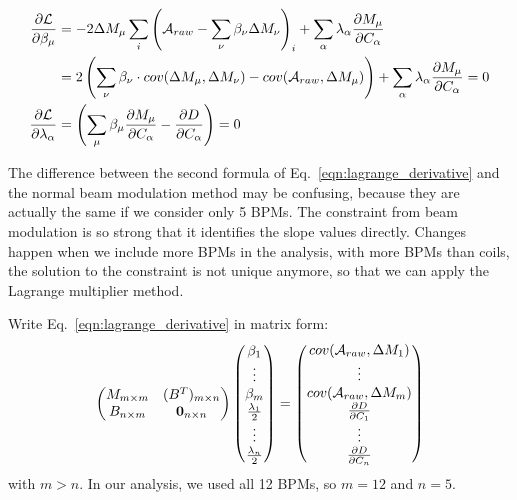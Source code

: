 \begin{equation}
    \begin{aligned}
	\frac{\partial \mathcal{L}}{\partial \beta_\mu} &= -2\Delta M_\mu \sum_i \left( \mathcal{A}_{raw} - \sum_\nu \beta_\nu \Delta M_\nu \right)_i + \sum_\alpha \lambda_\alpha \frac{\partial M_\mu}{\partial C_\alpha}    \\
	    &= 2 \left(\sum_\nu \beta_\nu \cdot cov(\Delta M_\mu, \Delta M_\nu) - cov(\mathcal{A}_{raw}, \Delta M_\mu) \right) + \sum_\alpha \lambda_\alpha \frac{\partial M_\mu}{\partial C_\alpha} = 0  \\
	\frac{\partial \mathcal{L}}{\partial \lambda_\alpha} &= \left( \sum_\mu \beta_\mu \frac{\partial M_\mu}{\partial C_\alpha} - \frac{\partial D}{\partial C_\alpha} \right) = 0\\
    \end{aligned}
    \label{eqn:lagrange_derivative}
\end{equation}

The difference between the second formula of Eq.~\ref{eqn:lagrange_derivative} and
the normal beam modulation method may be confusing, because they are actually
the same if we consider only 5 BPMs. The constraint from beam modulation is so 
strong that it identifies the slope values directly. Changes happen when we
include more BPMs in the analysis, with more BPMs than coils, the solution
to the constraint is not unique anymore, so that we can apply the Lagrange multiplier
method.

Write Eq.~\ref{eqn:lagrange_derivative} in matrix form:
\begin{equation}
    \begin{pmatrix}
	M_{m\times m}	& (B^T)_{m\times n}	\\
	B_{n \times m}  & \bm{0}_{n\times n}   \\
    \end{pmatrix}
    \begin{pmatrix}
	\beta_1	\\
	\vdots	\\
	\beta_m	\\
	\frac{\lambda_1}{2} \\
	\vdots	\\
	\frac{\lambda_n}{2} \\
    \end{pmatrix}
    =
    \begin{pmatrix}
	cov(\mathcal{A}_{raw}, \Delta M_1)  \\
	\vdots	\\
	cov(\mathcal{A}_{raw}, \Delta M_m)  \\
	\frac{\partial D}{\partial C_1}	\\
	\vdots	\\
	\frac{\partial D}{\partial C_n}	\\
    \end{pmatrix}
    \label{eqn:lagrange_derivative_1}
\end{equation}
with $m > n$. In our analysis, we used all 12 BPMs, so $m = 12$ and $n = 5$.

